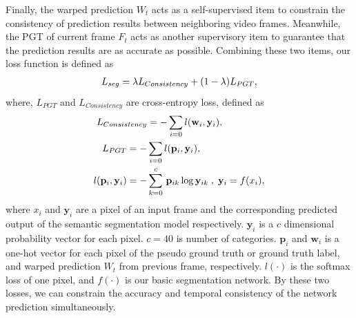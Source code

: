 Finally, the warped prediction $W_{t}$ acts as a self-supervised item to constrain the consistency of prediction results between neighboring video frames.
%
Meanwhile, the PGT of current frame $F_t$ acts as another supervisory item to guarantee that the prediction results are as accurate as possible.
Combining these two items, our loss function is defined as
\begin{equation}
\centering
\begin{aligned}
L_{seg}= \lambda L_{Consistency} +(1-\lambda)L_{PGT},
\end{aligned}
\end{equation}
%
where, ${L_{PGT}}$ and ${L_{Consistency}}$ are cross-entropy loss, defined as
\begin{equation}
{
\vspace*{-0.6cm} 
\centering     
\begin{aligned} 
L_{Consistency} &= -\sum_{i=0} l(\mathbf{w}_i,\mathbf{y}_i),\\
L_{PGT} = -&\sum_{i=0} l(\mathbf{p}_i,\mathbf{y}_i), \\
l(\mathbf{p}_i,\mathbf{y}_i) = -&\sum_{k=0}^c \,\mathbf{p}_{ik}\log{\mathbf{y}_{ik}}\;,\; \mathbf{y}_{i} = f(x_{i}),\\
\end{aligned}
}
\end{equation}
%
where ${x_i}$ and ${\mathbf{y}_i}$ are a pixel of an input frame and the corresponding predicted output of the semantic segmentation model respectively. 
%
$\mathbf{y}_i$ is a $c$ dimensional probability vector for each pixel.
${c}=40$ is number of categories.
%
${\mathbf{p}_i}$ and ${\mathbf{w}_i}$ is a one-hot vector for each pixel of the pseudo ground truth or ground truth label, and warped prediction $W_{t}$ from previous frame, respectively. 
%
${l(\cdot)}$ is the softmax loss of one pixel, and ${f(\cdot)}$ is our basic segmentation network. 
%
By these two losses, we can constrain the accuracy and temporal consistency of the network prediction simultaneously.
